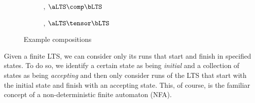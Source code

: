 \begin{figure}[ht]
    \centering
    \begin{subfigure}{0.5\textwidth}
        \centering
        \caption{, $\aLTS \comp \bLTS$}
        \label{fig:ltsCompAB}
    \end{subfigure}%
    \begin{subfigure}{0.5\textwidth}
        \centering
        \caption{, $\aLTS \tensor \bLTS$}
    \end{subfigure}%
\caption{Example \TLTS{} compositions}
\label{fig:exampleTLTScompositions}
\end{figure}

Given a finite LTS, we can consider only its runs that start and finish in
specified states. To do so, we identify a certain state as being \emph{initial}
and a collection of states as being \emph{accepting} and then only consider
runs of the LTS that start with the initial state and finish with an accepting
state. This, of course, is the familiar concept of a non-deterministic finite
automaton (NFA).
